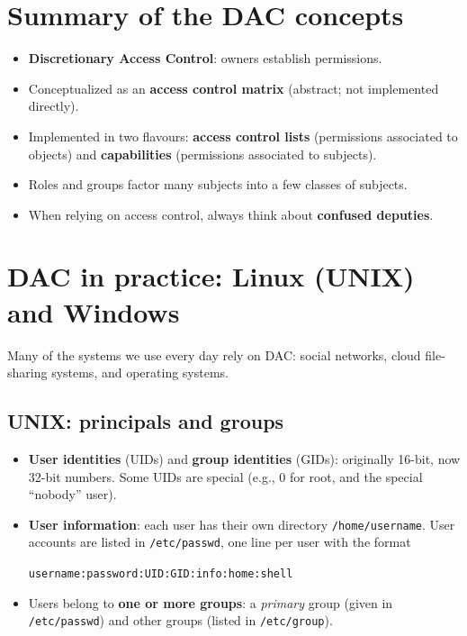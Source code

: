 \section{Summary of the DAC concepts}

\begin{itemize}
    \item \textbf{Discretionary Access Control}: owners establish permissions.
    \item Conceptualized as an \textbf{access control matrix} (abstract; not implemented directly).
    \item Implemented in two flavours: \textbf{access control lists} (permissions associated to objects) and \textbf{capabilities} (permissions associated to subjects).
    \item Roles and groups factor many subjects into a few classes of subjects.
    \item When relying on access control, always think about \textbf{confused deputies}.
\end{itemize}

\section{DAC in practice: Linux (UNIX) and Windows}

Many of the systems we use every day rely on DAC: social networks, cloud file-sharing systems, and operating systems.

\subsection{UNIX: principals and groups}

\begin{itemize}
    \item \textbf{User identities} (UIDs) and \textbf{group identities} (GIDs): originally 16-bit, now 32-bit numbers. Some UIDs are special (e.g., $0$ for root, and the special ``nobody'' user).
    \item \textbf{User information}: each user has their own directory \texttt{/home/username}. User accounts are listed in \texttt{/etc/passwd}, one line per user with the format
    \begin{center}
    \texttt{username:password:UID:GID:info:home:shell}
    \end{center}
    \item Users belong to \textbf{one or more groups}: a \emph{primary} group (given in \texttt{/etc/passwd}) and other groups (listed in \texttt{/etc/group}).
\end{itemize}

